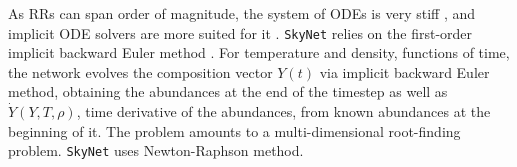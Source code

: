 %

%
As \acp{RR} can span order of magnitude, 
the system of \acp{ODE} is very stiff \citep{Timmes:1999,Hix:2005pf}, and implicit \ac{ODE} solvers 
are more suited for it \citep{Timmes:1999,Winteler:2012,Longland:2014}.
\texttt{SkyNet} relies on the first-order implicit backward Euler method \citep{Hix:1999}. %
%
For temperature and density, functions of time, the network evolves the composition 
vector $Y(t)$ via implicit backward Euler method, obtaining the abundances at 
the end of the timestep as well as $\dot{Y}(Y,T,\rho)$, time derivative of the abundances, 
from known abundances at the beginning of it. 
%
The problem amounts to a multi-dimensional root-finding problem. \texttt{SkyNet} uses 
Newton-Raphson method. 

